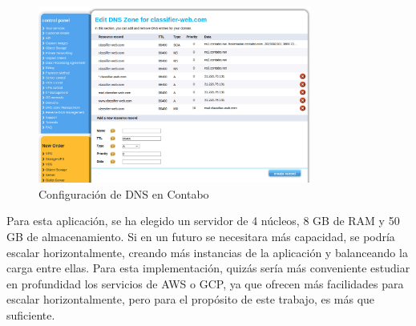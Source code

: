 \begin{figure}[htpb]
    \centering
    \includegraphics[width=0.8\textwidth]{cap3/images/contabo-dns.png}
    \caption{Configuración de DNS en Contabo}
    \label{fig:contabo-dns}
\end{figure}

Para esta aplicación, se ha elegido un servidor de 4 núcleos, 8 GB de RAM y 50 GB de almacenamiento.
Si en un futuro se necesitara más capacidad, se podría escalar horizontalmente, creando más instancias de la aplicación y balanceando la carga entre ellas.
Para esta implementación, quizás sería más conveniente estudiar en profundidad los servicios de AWS o GCP, ya que ofrecen más facilidades para escalar horizontalmente, pero para el propósito de este trabajo, es más que suficiente.





\endinput